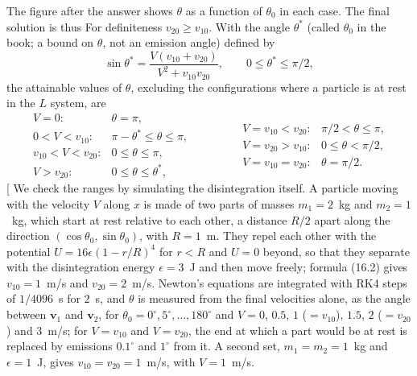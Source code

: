\begin{problem}[title={Range of angles between two decay products}]
{The figure after the answer shows $\theta$ as a function of $\theta_0$ in each case.
The final solution is thus
}
{
For definiteness $v_{20} \geq v_{10}$. With the angle $\theta^*$ (called $\theta_0$ in the book; a bound on $\theta$, not an emission angle) defined by
\begin{equation*}
    \sin{\theta^*} = \frac{V(v_{10}+v_{20})}{V^2 + v_{10}v_{20}}, \qquad 0 \leq \theta^* \leq \pi/2,
\end{equation*}
the attainable values of $\theta$, excluding the configurations where a particle is at rest in the $L$ system, are
\begin{equation*}
    \begin{array}{ll}
        V=0: & \theta = \pi, \\
        0<V<v_{10}: & \pi-\theta^* \leq \theta \leq \pi, \\
        v_{10}<V<v_{20}: & 0 \leq \theta \leq \pi, \\
        V>v_{20}: & 0 \leq \theta \leq \theta^*,
    \end{array}
    \qquad\qquad
    \begin{array}{ll}
        V=v_{10}<v_{20}: & \pi/2 < \theta \leq \pi, \\
        V=v_{20}>v_{10}: & 0 \leq \theta < \pi/2, \\
        V=v_{10}=v_{20}: & \theta = \pi/2.
    \end{array}
\end{equation*}
}
[
We check the ranges by simulating the disintegration itself. A particle moving with the velocity $V$ along $x$ is made of two parts of masses $m_1=2$~kg and $m_2=1$~kg, which start at rest relative to each other, a distance $R/2$ apart along the direction $(\cos{\theta_0},\sin{\theta_0})$, with $R=1$~m. They repel each other with the potential $U=16\epsilon(1-r/R)^4$ for $r<R$ and $U=0$ beyond, so that they separate with the disintegration energy $\epsilon=3$~J and then move freely; formula (16.2) gives $v_{10}=1$~m/s and $v_{20}=2$~m/s. Newton's equations are integrated with RK4 steps of $1/4096$~s for $2$~s, and $\theta$ is measured from the final velocities alone, as the angle between $\mathbf{v}_1$ and $\mathbf{v}_2$, for $\theta_0 = 0^\circ, 5^\circ, \ldots, 180^\circ$ and $V=0$, $0.5$, $1$ ($=v_{10}$), $1.5$, $2$ ($=v_{20}$) and $3$~m/s; for $V=v_{10}$ and $V=v_{20}$, the end at which a part would be at rest is replaced by emissions $0.1^\circ$ and $1^\circ$ from it. A second set, $m_1=m_2=1$~kg and $\epsilon=1$~J, gives $v_{10}=v_{20}=1$~m/s, with $V=1$~m/s.


\end{problem}
